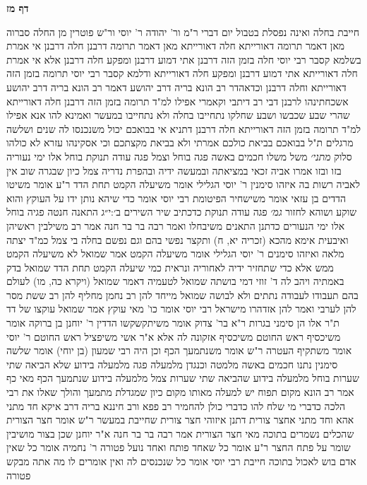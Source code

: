 \documentclass[12pt, openany]{book}
\newcommand{\sethebfont}{
\fontsize{10.5pt}{21.0pt} \selectfont
}
\newcommand{\twocol}[1]{
	{\sethebfont \begin{multicols}{2}
			#1
	\end{multicols}}	
}
\newcommand{\sectname}{}
\newcommand{\newsection}[1]{
	\addcontentsline{toc}{section}{#1}
	\renewcommand{\sectname}{#1}	
	\vspace{-\baselineskip}
	\begin{center}
		\textbf{%
\fontsize{16pt}{16pt}\selectfont
			#1}
	\end{center}
	\vspace{-\baselineskip}
	\nopagebreak
}
\begin{document}
\newsection{דף מז}
\twocol{חייבת בחלה ואינה נפסלת בטבול יום דברי ר"מ ור' יהודה  ר' יוסי ור"ש פוטרין מן החלה 
סברוה  מאן דאמר תרומה דאורייתא חלה דאורייתא מאן דאמר תרומה דרבנן חלה דרבנן  אי אמרת בשלמא קסבר רבי יוסי חלה בזמן הזה דרבנן אתי דמוע דרבנן ומפקע חלה דרבנן 
אלא אי אמרת חלה דאורייתא אתי דמוע דרבנן ומפקע חלה דאורייתא 
ודלמא קסבר רבי יוסי תרומה בזמן הזה דאורייתא וחלה דרבנן 
וכדאהדר רב הונא בריה דרב יהושע  דאמר רב הונא בריה דרב יהושע אשכחתינהו לרבנן דבי רב דיתבי וקאמרי  אפילו למ"ד תרומה בזמן הזה דרבנן חלה דאורייתא
שהרי שבע שכבשו ושבע שחלקו נתחייבו בחלה ולא נתחייבו במעשר 
ואמינא להו אנא  אפילו למ"ד תרומה בזמן הזה דאורייתא חלה דרבנן דתניא  אי בבואכם יכול משנכנסו לה שנים ושלשה מרגלים  ת"ל בבואכם בביאת כולכם אמרתי ולא בביאת מקצתכם
וכי אסקינהו עזרא לא כולהו סלוק
{\large\emph{מתני׳}} משל משלו חכמים באשה פגה בוחל וצמל  פגה עודה תנוקת בוחל אלו ימי נעוריה
בזו ובזו אמרו  אביה זכאי במציאתה ובמעשה ידיה ובהפרת נדריה  צמל כיון שבגרה שוב אין לאביה רשות בה 
איזהו סימנין  ר' יוסי הגלילי אומר  משיעלה הקמט תחת הדד  ר"ע אומר  משיטו הדדים  בן עזאי אומר  משישחיר הפיטומת  רבי יוסי אומר  כדי שיהא נותן ידו על העוקץ והוא שוקע ושוהא לחזור
{\large\emph{גמ׳}} פגה עודה תנוקת כדכתיב {שיר השירים ב׳:י״ג } התאנה חנטה פגיה בוחל אלו ימי הנעורים כדתנן  התאנים משיבחלו ואמר רבה בר בר חנה אמר רב  משילבין ראשיהן 
ואיבעית אימא  מהכא (זכריה יא, ח) ותקצר נפשי בהם וגם נפשם בחלה בי  צמל כמ"ד  יצתה מלאה
ואיזהו סימנים  ר' יוסי הגלילי אומר משיעלה הקמט אמר שמואל  לא משיעלה הקמט ממש אלא כדי שתחזיר ידיה לאחוריה ונראית כמי שיעלה הקמט תחת הדד 
שמואל בדק באמתיה ויהב לה ד' זוזי דמי בושתה  שמואל לטעמיה דאמר שמואל  (ויקרא כה, מו) לעולם בהם תעבודו לעבודה נתתים ולא לבושה 
שמואל מייחד להן רב נחמן מחליף להן רב ששת מסר להן לערבי ואמר להן  אזדהרו מישראל
רבי יוסי אומר כו' מאי עוקץ  אמר שמואל  עוקצו של דד 
ת"ר  אלו הן סימני בגרות  ר"א בר' צדוק אומר  משיתקשקשו הדדין  ר' יוחנן בן ברוקה אומר  משיכסיף ראש החוטם  משיכסיף  אזקונה לה  אלא א"ר אשי  משיפציל ראש החוטם  ר' יוסי אומר  משתקיף העטרה ר"ש אומר  משנתמעך
הכף 
וכן היה רבי שמעון (בן יוחי) אומר  שלשה סימנין נתנו חכמים באשה מלמטה וכנגדן מלמעלה  פגה מלמעלה בידוע שלא הביאה שתי שערות  בוחל מלמעלה בידוע שהביאה שתי שערות  צמל מלמעלה בידוע שנתמעך הכף 
מאי כף  אמר רב הונא  מקום תפוח יש למעלה מאותו מקום כיון שמגדלת מתמעך והולך  שאלו את רבי  הלכה כדברי מי  שלח להו  כדברי כולן להחמיר 
רב פפא ורב חיננא בריה דרב איקא חד מתני אהא וחד מתני אחצר צורית  דתנן איזוהי חצר צורית שחייבת במעשר  ר"ש אומר  חצר הצורית שהכלים נשמרים בתוכה 
מאי חצר הצורית  אמר רבה בר בר חנה א"ר יוחנן  שכן בצור מושיבין שומר על פתח החצר  ר"ע אומר  כל שאחד פותח ואחד נועל פטורה 
ר' נחמיה אומר  כל שאין אדם בוש לאכול בתוכה חייבת  רבי יוסי אומר  כל שנכנסים לה ואין אומרים לו מה אתה מבקש פטורה 
}
\end{document}
